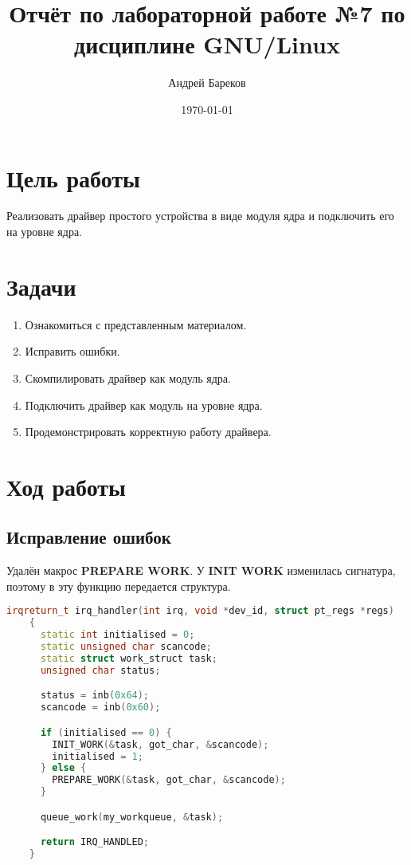 \documentclass[a4paper,11pt]{article}
\title{Отчёт по лабораторной работе №7 по дисциплине GNU/Linux}
\author{Андрей Бареков}
\date{\today}
\begin{document}
\maketitle
\newpage

\section{Цель работы}
  Реализовать драйвер простого устройства в виде модуля ядра и подключить его на уровне ядра.

\section{Задачи}
  \begin{enumerate}
    \item Ознакомиться с представленным материалом.
    \item Исправить ошибки.
    \item Скомпилировать драйвер как модуль ядра.
    \item Подключить драйвер как модуль на уровне ядра.
    \item Продемонстрировать корректную работу драйвера.
  \end{enumerate}

\newpage
\section{Ход работы}
  \subsection{Исправление ошибок}

    Удалён макрос \textbf{PREPARE WORK}.
    У \textbf{INIT WORK} изменилась сигнатура, поэтому в эту функцию
    передается структура.

    \lstset{style=diffred}
    \begin{lstlisting}[language = C++]
    irqreturn_t irq_handler(int irq, void *dev_id, struct pt_regs *regs)
    {
      static int initialised = 0;
      static unsigned char scancode;
      static struct work_struct task;
      unsigned char status;

      status = inb(0x64);
      scancode = inb(0x60);

      if (initialised == 0) {
        INIT_WORK(&task, got_char, &scancode);
        initialised = 1;
      } else {
        PREPARE_WORK(&task, got_char, &scancode);
      }

      queue_work(my_workqueue, &task);

      return IRQ_HANDLED;
    }
    \end{lstlisting}
\end{document}
